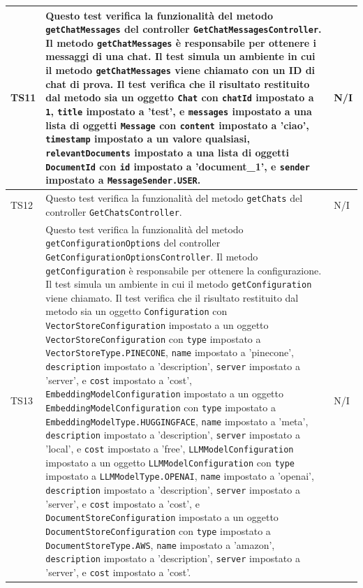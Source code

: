 \documentclass[10pt, a4paper]{article}
\begin{document}
\begin{xltabular}{\textwidth}{p{0.12\textwidth}|X|p{0.12\textwidth}}
    \hline
    TS11 & Questo test verifica la funzionalità del metodo \texttt{getChatMessages} del controller \texttt{GetChatMessagesController}. Il metodo \texttt{getChatMessages} è responsabile per ottenere i messaggi di una chat. Il test simula un ambiente in cui il metodo \texttt{getChatMessages} viene chiamato con un ID di chat di prova. Il test verifica che il risultato restituito dal metodo sia un oggetto \texttt{Chat} con \texttt{chatId} impostato a \texttt{1}, \texttt{title} impostato a 'test', e \texttt{messages} impostato a una lista di oggetti \texttt{Message} con \texttt{content} impostato a 'ciao', \texttt{timestamp} impostato a un valore qualsiasi, \texttt{relevantDocuments} impostato a una lista di oggetti \texttt{DocumentId} con \texttt{id} impostato a 'document\_1', e \texttt{sender} impostato a \texttt{MessageSender.USER}. & N/I \\
    \hline
    TS12 & Questo test verifica la funzionalità del metodo \texttt{getChats} del controller \texttt{GetChatsController}. & N/I \\
    \hline
    TS13 & Questo test verifica la funzionalità del metodo \texttt{getConfigurationOptions} del controller \texttt{GetConfigurationOptionsController}. Il metodo \texttt{getConfiguration} è responsabile per ottenere la configurazione. Il test simula un ambiente in cui il metodo \texttt{getConfiguration} viene chiamato. Il test verifica che il risultato restituito dal metodo sia un oggetto \texttt{Configuration} con \texttt{VectorStoreConfiguration} impostato a un oggetto \texttt{VectorStoreConfiguration} con \texttt{type} impostato a \texttt{VectorStoreType.PINECONE}, \texttt{name} impostato a 'pinecone', \texttt{description} impostato a 'description', \texttt{server} impostato a 'server', e \texttt{cost} impostato a 'cost', \texttt{EmbeddingModelConfiguration} impostato a un oggetto \texttt{EmbeddingModelConfiguration} con \texttt{type} impostato a \texttt{EmbeddingModelType.HUGGINGFACE}, \texttt{name} impostato a 'meta', \texttt{description} impostato a 'description', \texttt{server} impostato a 'local', e \texttt{cost} impostato a 'free', \texttt{LLMModelConfiguration} impostato a un oggetto \texttt{LLMModelConfiguration} con \texttt{type} impostato a \texttt{LLMModelType.OPENAI}, \texttt{name} impostato a 'openai', \texttt{description} impostato a 'description', \texttt{server} impostato a 'server', e \texttt{cost} impostato a 'cost', e \texttt{DocumentStoreConfiguration} impostato a un oggetto \texttt{DocumentStoreConfiguration} con \texttt{type} impostato a \texttt{DocumentStoreType.AWS}, \texttt{name} impostato a 'amazon', \texttt{description} impostato a 'description', \texttt{server} impostato a 'server', e \texttt{cost} impostato a 'cost'. & N/I \\

\end{xltabular}
\end{document}

